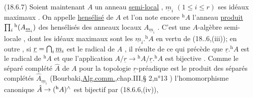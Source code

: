 (18.6.7) Soient maintenant $A$ un anneau \uline{semi-local} , $\underline m_i$ $(1\leq i\leq r)$ ses idéaux
maximaux . On appelle \uline{hensélisé} de $A$ et l'on note encore $ {}^{\mathrm h}A$ l'anneau \uline{produit}
$\prod_i{}^{\mathrm h}(A_{\underline m_i})$ des hensélisés des anneaux locaux $A_{\underline m_i}$ . C'est  une $A$-algèbre semi-locale
, dont les idéaux maximaux sont les $\underline m_i.{}^{\mathrm h}A$ en vertu de (18..6,(iii));
en outre , si $\underline r=\bigcap_i\underline m_i$ est le radical de $A$ , il résulte de ce qui précède
que $\underline r.{}^{\mathrm h}A$ est le radical de $ {}^{\mathrm h}A$ et que l'application $A/\underline r\to{}^{\mathrm h}A/\underline r.{}^{\mathrm h}A$ est bijective
. Comme le séparé complété $\hat A$ de $A$ pour la topologie $\underline r$-préadique est le
produit des séparés complétés $\hat A_{\underline m_i}$ (Bourbaki,\uline{Alg.comm.},chap.III,§ 2,n°13 ) l'homomorphisme canonique $\hat A\to({}^{\mathrm h}A){}^{\wedge}$ est bijectif par (18.6.6,(iv)),
